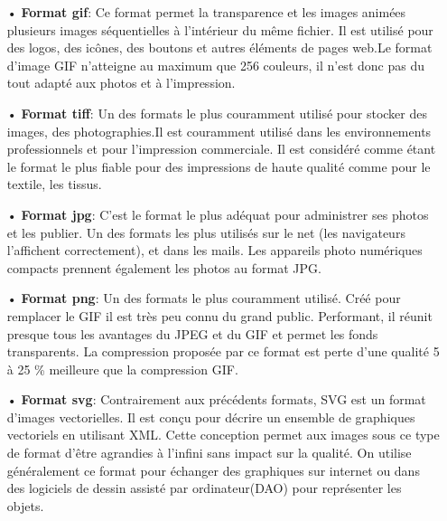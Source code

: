     \begin{itemize}
        \item[•]\textbf{Format \acrfull{gif}}: Ce format permet la transparence et les images animées plusieurs images séquentielles à l’intérieur du même fichier. Il est utilisé pour des logos, des icônes, des boutons et autres éléments de pages web.Le format d’image GIF n’atteigne au maximum que 256 couleurs, il n’est donc pas du tout adapté aux photos et à l’impression.
        \item[•]\textbf{Format \acrfull{tiff}}: Un des formats le plus couramment utilisé pour stocker des images, des photographies.Il est couramment utilisé dans les environnements professionnels et pour l’impression commerciale. Il est considéré comme étant le format le plus fiable pour des impressions de haute qualité comme pour le textile, les tissus.
        \item[•]\textbf{Format \acrfull{jpg}}: C’est le format le plus adéquat pour administrer ses photos et les publier. Un des formats les plus utilisés sur le net (les navigateurs l’affichent correctement), et dans les mails. Les appareils photo numériques compacts prennent également les photos au format JPG.
        \item[•]\textbf{Format \acrfull{png}}: Un des formats le plus couramment utilisé. Créé pour remplacer le GIF il est très peu connu du grand public. Performant, il réunit presque tous les avantages du JPEG et du GIF et permet les fonds transparents. La compression proposée par ce format est perte d’une qualité 5 à 25 \% meilleure que la compression GIF. \cite{akacemMaster}
        \item[•]\textbf{Format \acrfull{svg}}: Contrairement aux précédents formats, SVG est un format d’images vectorielles. Il est conçu pour décrire un ensemble de graphiques vectoriels en utilisant XML. Cette conception permet aux images sous ce type de format d’être agrandies à l’infini sans impact sur la qualité. On utilise généralement ce format pour échanger des graphiques sur internet ou dans des logiciels de dessin assisté par ordinateur(DAO) pour représenter les objets.    
    \end{itemize}